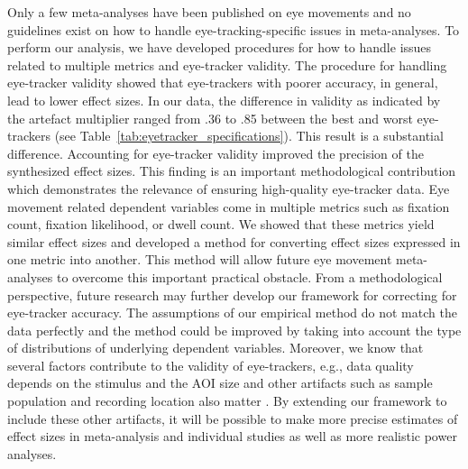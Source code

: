 Only a few meta-analyses have been published on eye movements and no guidelines exist on how to handle eye-tracking-specific issues in meta-analyses. To perform our analysis, we have developed procedures for how to handle issues related to multiple metrics and eye-tracker validity. The procedure for handling eye-tracker validity showed that eye-trackers with poorer accuracy, in general, lead to lower effect sizes. In our data, the difference in validity as indicated by the artefact multiplier ranged from .36 to .85 between the best and worst eye-trackers (see Table~\ref{tab:eyetracker_specifications}). This result is a substantial difference. Accounting for eye-tracker validity improved the precision of the synthesized effect sizes. This finding is an important methodological contribution which demonstrates the relevance of ensuring high-quality eye-tracker data. Eye movement related dependent variables come in multiple metrics such as fixation count, fixation likelihood, or dwell count. We showed that these metrics yield similar effect sizes and developed a method for converting effect sizes expressed in one metric into another. This method will allow future eye movement meta-analyses to overcome this important practical obstacle. From a methodological perspective, future research may further develop our framework for correcting for eye-tracker accuracy. The assumptions of our empirical method do not match the data perfectly and the method could be improved by taking into account the type of distributions of underlying dependent variables. Moreover, we know that several factors contribute to the validity of eye-trackers, e.g., data quality depends on the stimulus and the AOI size \citep{orquin2018a} and other artifacts such as sample population and recording location also matter \citep{nystroem2013a}. By extending our framework to include these other artifacts, it will be possible to make more precise estimates of effect sizes in meta-analysis and individual studies as well as more realistic power analyses.\\   



